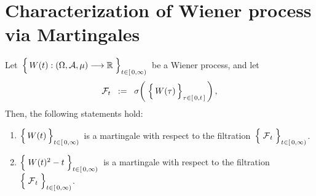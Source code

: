 

\section{Characterization of Wiener process via Martingales}
\setcounter{theorem}{0}
\setcounter{equation}{0}


\renewcommand{\theenumi}{\roman{enumi}}
\renewcommand{\labelenumi}{\textnormal{(\theenumi)}$\;\;$}


\vskip 0.5cm
\begin{proposition}
\label{WienerProcessMartingales}
\mbox{}
\vskip 0.2cm
\noindent
Let
\,$\left\{\,\overset{{\color{white}.}}{W}(t) : (\Omega,\mathcal{A},\mu) \longrightarrow \Re \;\right\}_{t \in[\,0,\infty)}$\,
be a Wiener process, and let
\begin{equation*}
\mathcal{F}_{t}
\;\; := \;\;
	\sigma\!\left(\;\left\{\,
		\overset{{\color{white}.}}{W}(\tau)
		\,\right\}_{\tau \in [\,0,t\,]}\,\right),
\end{equation*}	
Then, the following statements hold:
\begin{enumerate}
\item
	$\left\{\,\overset{{\color{white}.}}{W}(t)\,\right\}_{t \in[\,0,\infty)}$\,
	is a martingale with respect to the filtration
	\,$\left\{\;\overset{{\color{white}.}}{\mathcal{F}}_{t}\;\right\}_{t\in[\,0,\infty)}$.
\item
	$\left\{\; \overset{{\color{white}.}}{W}(t)^{2} - t \;\right\}_{t \in[\,0,\infty)}$\,
	is a martingale with respect to the filtration
	\,$\left\{\;\overset{{\color{white}.}}{\mathcal{F}}_{t}\;\right\}_{t\in[\,0,\infty)}$.
\end{enumerate}
\end{proposition}
\proof
